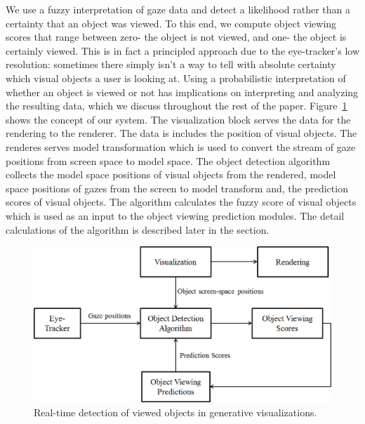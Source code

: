 We use a fuzzy interpretation of gaze data and detect a likelihood rather than a certainty that an object was viewed. To this end, we compute object viewing scores that range between zero- the object is not viewed, and one- the object is certainly viewed.  This is in fact a principled approach due to the eye-tracker's low resolution: sometimes there simply isn't a way to tell with absolute certainty which visual objects a user is looking at. Using a probabilistic interpretation of whether an object is viewed or not has implications on interpreting and analyzing the resulting data, which we discuss throughout the rest of the paper. Figure~\ref{fig:systemBlockDiagram} shows the concept of our system. The visualization block serves the data for the rendering to the renderer. The data is includes the position of visual objects. The renderes serves model transformation which is used to convert the stream of gaze positions from screen space to model space. The object detection algorithm collects the model space positions of visual objects from the rendered, model space positions of gazes from the screen to model transform and, the prediction scores of visual objects. The algorithm calculates the fuzzy score of visual objects which is used as an input to the object viewing prediction modules. The detail calculations of the algorithm is described later in the section.

\begin{figure}[htb]
  \centering
  \includegraphics[width=\linewidth]{images/systemBlockDiagram.eps}
  \caption{Real-time detection of viewed objects in generative visualizations.}
	\label{fig:systemBlockDiagram}
\end{figure}

